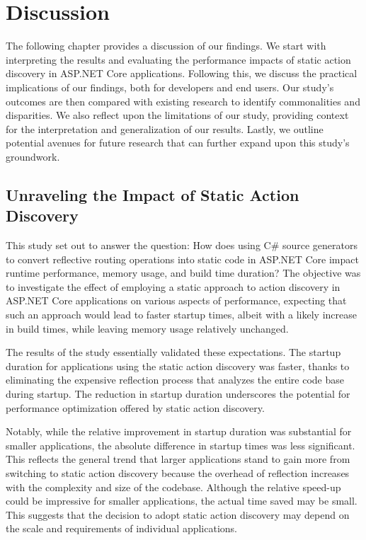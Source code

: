 \chapter{Discussion}

The following chapter provides a discussion of our findings. We start with interpreting the results and evaluating the performance impacts of static action discovery in ASP.NET Core applications. Following this, we discuss the practical implications of our findings, both for developers and end users. Our study's outcomes are then compared with existing research to identify commonalities and disparities. We also reflect upon the limitations of our study, providing context for the interpretation and generalization of our results. Lastly, we outline potential avenues for future research that can further expand upon this study's groundwork.

\section{Unraveling the Impact of Static Action Discovery}

This study set out to answer the question: How does using C\# source generators to convert reflective routing operations into static code in ASP.NET Core impact runtime performance, memory usage, and build time duration? The objective was to investigate the effect of employing a static approach to action discovery in ASP.NET Core applications on various aspects of performance, expecting that such an approach would lead to faster startup times, albeit with a likely increase in build times, while leaving memory usage relatively unchanged.

The results of the study essentially validated these expectations. The startup duration for applications using the static action discovery was faster, thanks to eliminating the expensive reflection process that analyzes the entire code base during startup. The reduction in startup duration underscores the potential for performance optimization offered by static action discovery.

Notably, while the relative improvement in startup duration was substantial for smaller applications, the absolute difference in startup times was less significant. This reflects the general trend that larger applications stand to gain more from switching to static action discovery because the overhead of reflection increases with the complexity and size of the codebase. Although the relative speed-up could be impressive for smaller applications, the actual time saved may be small. This suggests that the decision to adopt static action discovery may depend on the scale and requirements of individual applications.

